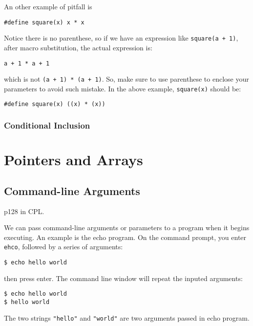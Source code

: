 \documentclass[11pt]{article}
\begin{document}
An other example of pitfall is
\begin{verbatim}
#define square(x) x * x
\end{verbatim}
Notice there is no parenthese, so if we have an expression like \texttt{square(a + 1)}, after macro substitution, the actual expression is:
\begin{verbatim}
a + 1 * a + 1
\end{verbatim}
which is not \texttt{(a + 1) * (a + 1)}. So, make sure to use parenthese to enclose your parameters to avoid such mistake. In the above example, \texttt{square(x)} should be:
\begin{verbatim}
#define square(x) ((x) * (x))
\end{verbatim}

\subsubsection{Conditional Inclusion}
\label{sec:org32f2136}
\section{Pointers and Arrays}
\label{sec:orgbba6fa0}
\subsection{Command-line Arguments}
\label{sec:org8c7bea1}
p128 in CPL.

We can pass command-line arguments or parameters to a program when it begins executing. An example is the echo program. On the command prompt, you enter \texttt{ehco}, followed by a series of arguments:
\begin{Verbatim}[frame=single]
$ echo hello world
\end{Verbatim}
then press enter. The command line window will repeat the inputed arguments:
\begin{Verbatim}[frame=single]
$ echo hello world
$ hello world
\end{Verbatim}
The two strings \texttt{"hello"} and \texttt{"world"} are two arguments passed in echo program.
\end{document}
